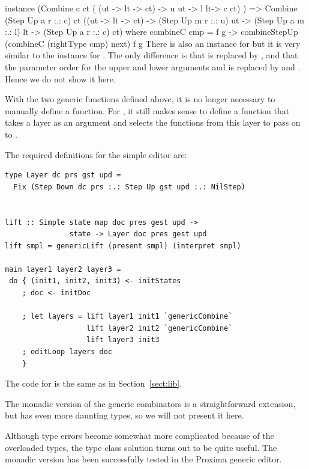 \documentclass[preprint,natbib]{sigplanconf}
\begin{document}
\bc
instance (Combine c ct ( (ut -> lt -> ct) ->
                        u ut -> l lt-> c ct) ) =>
         Combine (Step Up a r :.: c) ct
                 ((ut -> lt -> ct) -> 
                  (Step Up m r :.: u) ut -> 
                  (Step Up a m :.: l) lt -> 
                  (Step Up a r :.: c) ct) where
  combineC cmp = \next f g ->
    combineStepUp (combineC (rightType cmp) next) f g
\ec
There is also an instance for  but it is very similar to the instance for . The only difference is that  is replaced by , and that the parameter order for the upper and lower arguments   and  is replaced by  and . Hence we do not show it here.





With the two generic functions defined above, it is no longer necessary to manually define a  function. For , it still makes sense to define a function that takes a layer as an argument and selects the functions from this layer to pass on to .

The required definitions for the simple editor are:

\begin{small}
\begin{verbatim}
type Layer dc prs gst upd = 
  Fix (Step Down dc prs :.: Step Up gst upd :.: NilStep)

                
lift :: Simple state map doc pres gest upd ->
               state -> Layer doc pres gest upd
lift smpl = genericLift (present smpl) (interpret smpl)

main layer1 layer2 layer3 =
 do { (init1, init2, init3) <- initStates
    ; doc <- initDoc 

    ; let layers = lift layer1 init1 `genericCombine` 
                   lift layer2 init2 `genericCombine`
                   lift layer3 init3
    ; editLoop layers doc
    }
\end{verbatim}
\end{small}

The code for  is the same as in Section~\ref{sect:lib}.

The monadic version of the generic combinators is a straightforward extension, but has even more daunting types, so we will not present it here. 

Although type errors become somewhat more complicated because of the overloaded types, the type class solution turns out to be quite useful. The monadic version has been successfully tested in the Proxima generic editor.
\end{document}
